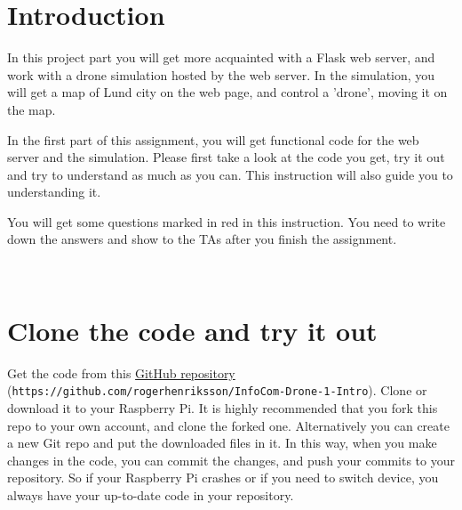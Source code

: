 \documentclass{article}
\begin{document}
\restoregeometry
\newpage


\section{Introduction}
In this project part you will get more acquainted with a Flask web server, and work with a drone simulation hosted by the web server. In the simulation, you will get a map of Lund city on the web page, and control a 'drone', moving it on the map.

In the first part of this assignment, you will get functional code for the web server and the simulation. Please first take a look at the code you get, try it out and try to understand as much as you can. This instruction will also guide you to understanding it.\\

\parbox[t]{14cm}{{You will get some questions marked in red in this instruction. You need to write down the answers and show to the TAs after you finish the assignment.}}\\

\section{Clone the code and try it out}
Get the code from this {\color{blue}\href{https://github.com/rogerhenriksson/InfoCom-Drone-1-Intro}{GitHub repository}} ({\small \texttt{https://github.com/rogerhenriksson/InfoCom-Drone-1-Intro}}). Clone or download it to your Raspberry Pi. It is highly recommended that you fork this repo to your own account, and clone the forked one. Alternatively you can create a new Git repo and put the downloaded files in it. In this way, when you make changes in the code, you can commit the changes, and push your commits to your repository. So if your Raspberry Pi crashes or if you need to switch device, you always have your up-to-date code in your repository.
\end{document}

